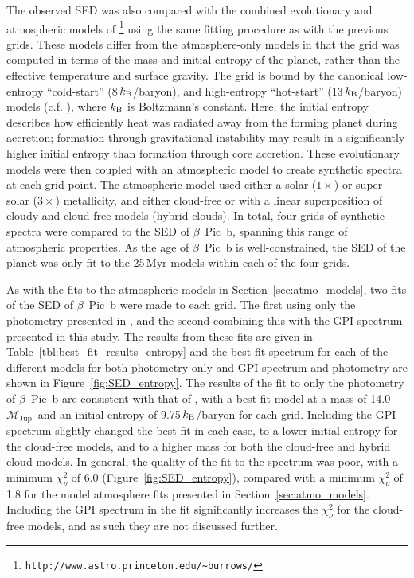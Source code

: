 \documentclass[twocolumn]{aastex6}
\newcommand{\mjup}{$\mathcal{M}_\mathrm{Jup}$}
\begin{document}
The observed SED was also compared with the combined evolutionary and atmospheric models of \citet{SpiegelBurrows2012}\footnote{{\tt http://www.astro.princeton.edu/\~{}burrows/}} using the same fitting procedure as with the previous grids. These models differ from the atmosphere-only models in that the grid was computed in terms of the mass and initial entropy of the planet, rather than the effective temperature and surface gravity. The \citet{SpiegelBurrows2012} grid is bound by the canonical low-entropy ``cold-start'' (8\,$k_{\rm B}$/baryon), and high-entropy ``hot-start'' (13\,$k_{\rm B}$/baryon) models (c.f. \citealt{Marley:2007bf}), where $k_{\rm B}$ is Boltzmann's constant. Here, the initial entropy describes how efficiently heat was radiated away from the forming planet during accretion; formation through gravitational instability may result in a significantly higher initial entropy than formation through core accretion. These evolutionary models were then coupled with an atmospheric model \citep{Hubeny:2003eb,Burrows:2006ia} to create synthetic spectra at each grid point. The atmospheric model used either a solar ($1\times$) or super-solar ($3\times$) metallicity, and either cloud-free or with a linear superposition of cloudy and cloud-free models (hybrid clouds). In total, four grids of synthetic spectra were compared to the SED of $\beta$~Pic~b, spanning this range of atmospheric properties. As the age of $\beta$~Pic~b is well-constrained, the SED of the planet was only fit to the 25\,Myr models within each of the four grids.

As with the fits to the atmospheric models in Section~\ref{sec:atmo_models}, two fits of the SED of $\beta$~Pic~b were made to each grid. The first using only the photometry presented in \citet{Morzinski2015}, and the second combining this with the GPI spectrum presented in this study. The results from these fits are given in Table~\ref{tbl:best_fit_results_entropy} and the best fit spectrum for each of the different models for both photometry only and GPI spectrum and photometry are shown in Figure~\ref{fig:SED_entropy}. The results of the fit to only the photometry of $\beta$~Pic~b are consistent with that of \citet{Morzinski2015}, with a best fit model at a mass of 14.0\,\mjup\ and an initial entropy of 9.75\,$k_{\rm B}$/baryon for each grid. Including the GPI spectrum slightly changed the best fit in each case, to a lower initial entropy for the cloud-free models, and to a higher mass for both the cloud-free and hybrid cloud models. In general, the quality of the fit to the spectrum was poor, with a minimum $\chi^2_{\nu}$ of 6.0 (Figure~\ref{fig:SED_entropy}), compared with a minimum $\chi^2_{\nu}$ of 1.8 for the model atmosphere fits presented in Section~\ref{sec:atmo_models}. Including the GPI spectrum in the fit significantly increases the $\chi^2_{\nu}$ for the cloud-free models, and as such they are not discussed further.
\end{document}
